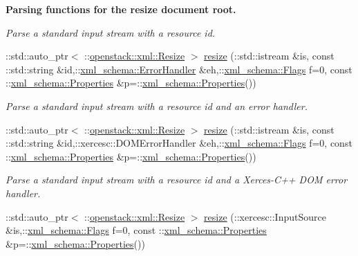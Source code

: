 \begin{Indent}{\bf Parsing functions for the resize document root.}
\begin{DoxyCompactItemize}
\begin{DoxyCompactList}\small\item\em Parse a standard input stream with a resource id. \item\end{DoxyCompactList}\item 
::std::auto\_\-ptr$<$ ::\hyperlink{classopenstack_1_1xml_1_1Resize}{openstack::xml::Resize} $>$ \hyperlink{namespaceopenstack_1_1xml_a4d5dd7b4912656e644a481a191a85657}{resize} (::std::istream \&is, const ::std::string \&id,::\hyperlink{namespacexml__schema_ab1c9361bfd3b404eaabf0c31eded79dc}{xml\_\-schema::ErrorHandler} \&eh,::\hyperlink{namespacexml__schema_affb4c227cbd9aa7453dd1dc5a1401943}{xml\_\-schema::Flags} f=0, const ::\hyperlink{namespacexml__schema_ad27ce19a7ee1d3b1064092648898f64c}{xml\_\-schema::Properties} \&p=::\hyperlink{namespacexml__schema_ad27ce19a7ee1d3b1064092648898f64c}{xml\_\-schema::Properties}())
\begin{DoxyCompactList}\small\item\em Parse a standard input stream with a resource id and an error handler. \item\end{DoxyCompactList}\item 
::std::auto\_\-ptr$<$ ::\hyperlink{classopenstack_1_1xml_1_1Resize}{openstack::xml::Resize} $>$ \hyperlink{namespaceopenstack_1_1xml_a3043c464da45c9de75e62c8c1ef66b0f}{resize} (::std::istream \&is, const ::std::string \&id,::xercesc::DOMErrorHandler \&eh,::\hyperlink{namespacexml__schema_affb4c227cbd9aa7453dd1dc5a1401943}{xml\_\-schema::Flags} f=0, const ::\hyperlink{namespacexml__schema_ad27ce19a7ee1d3b1064092648898f64c}{xml\_\-schema::Properties} \&p=::\hyperlink{namespacexml__schema_ad27ce19a7ee1d3b1064092648898f64c}{xml\_\-schema::Properties}())
\begin{DoxyCompactList}\small\item\em Parse a standard input stream with a resource id and a Xerces-\/C++ DOM error handler. \item\end{DoxyCompactList}\item 
::std::auto\_\-ptr$<$ ::\hyperlink{classopenstack_1_1xml_1_1Resize}{openstack::xml::Resize} $>$ \hyperlink{namespaceopenstack_1_1xml_a1d86f5e55b316e094a805caf10696ef3}{resize} (::xercesc::InputSource \&is,::\hyperlink{namespacexml__schema_affb4c227cbd9aa7453dd1dc5a1401943}{xml\_\-schema::Flags} f=0, const ::\hyperlink{namespacexml__schema_ad27ce19a7ee1d3b1064092648898f64c}{xml\_\-schema::Properties} \&p=::\hyperlink{namespacexml__schema_ad27ce19a7ee1d3b1064092648898f64c}{xml\_\-schema::Properties}())

\end{DoxyCompactItemize}
\end{Indent}
